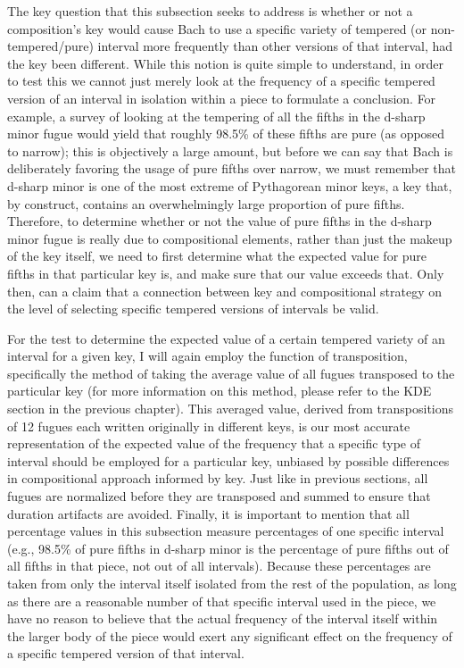 The key question that this subsection seeks to address is whether or not
a composition's key would cause Bach to use a specific variety of
tempered (or non-tempered/pure) interval more frequently than other
versions of that interval, had the key been different. While this notion
is quite simple to understand, in order to test this we cannot just
merely look at the frequency of a specific tempered version of an
interval in isolation within a piece to formulate a conclusion. For
example, a survey of looking at the tempering of all the fifths in the
d-sharp minor fugue would yield that roughly 98.5\% of these fifths are
pure (as opposed to narrow); this is objectively a large amount, but
before we can say that Bach is deliberately favoring the usage of pure
fifths over narrow, we must remember that d-sharp minor is one of the
most extreme of Pythagorean minor keys, a key that, by construct,
contains an overwhelmingly large proportion of pure fifths. Therefore,
to determine whether or not the value of pure fifths in the d-sharp
minor fugue is really due to compositional elements, rather than just
the makeup of the key itself, we need to first determine what the
expected value for pure fifths in that particular key is, and make sure
that our value exceeds that. Only then, can a claim that a connection
between key and compositional strategy on the level of selecting
specific tempered versions of intervals be valid.

For the test to determine the expected value of a certain tempered
variety of an interval for a given key, I will again employ the function
of transposition, specifically the method of taking the average value of
all fugues transposed to the particular key (for more information on
this method, please refer to the KDE section in the previous chapter).
This averaged value, derived from transpositions of 12 fugues each
written originally in different keys, is our most accurate
representation of the expected value of the frequency that a specific
type of interval should be employed for a particular key, unbiased by
possible differences in compositional approach informed by key. Just
like in previous sections, all fugues are normalized before they are
transposed and summed to ensure that duration artifacts are avoided.
Finally, it is important to mention that all percentage values in this
subsection measure percentages of one specific interval (e.g., 98.5\% of
pure fifths in d-sharp minor is the percentage of pure fifths out of all
fifths in that piece, not out of all intervals). Because these
percentages are taken from only the interval itself isolated from the
rest of the population, as long as there are a reasonable number of that
specific interval used in the piece, we have no reason to believe that
the actual frequency of the interval itself within the larger body of
the piece would exert any significant effect on the frequency of a
specific tempered version of that interval.

